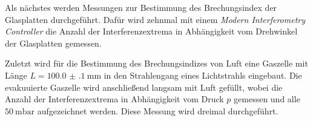 Als n\"achstes werden Messungen zur Bestimmung des Brechungsindex der Glasplatten durchgef\"uhrt. Daf\"ur wird zehnmal mit einem \textit{Modern Interferometry Controller} die Anzahl der Interferenzextrema
in Abh\"angigkeit vom Drehwinkel der Glasplatten gemessen.

Zuletzt wird f\"ur die Bestimmung des Brechungsindizes von Luft eine Gaszelle mit L\"ange $L=\SI{100.0(1)}{\milli\metre}$ in den Strahlengang eines Lichtstrahls eingebaut.
Die evakuuierte Gaszelle wird anschließend langsam mit Luft gef\"ullt, wobei die Anzahl der Interferenzextrema in Abh\"angigkeit vom Druck $p$ gemessen und alle $\SI{50}{\milli\bar}$ aufgezeichnet werden.
Diese Messung wird dreimal durchgef\"uhrt.